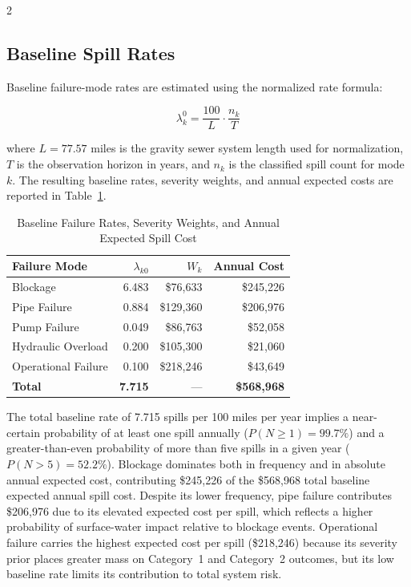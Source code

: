 \documentclass[10pt]{article}
\begin{document}
\begin{multicols}{2}
\subsection{Baseline Spill Rates}
 
Baseline failure-mode rates are estimated using the normalized
rate formula:
 
\[
\lambda_k^0 = \frac{100}{L} \cdot \frac{n_k}{T}
\]
 
where $L = 77.57$ miles is the gravity sewer system length used for
normalization, $T$ is the observation horizon in years, and $n_k$ is
the classified spill count for mode $k$. The resulting baseline rates,
severity weights, and annual expected costs are reported in
Table~\ref{tab:baseline-rates}.
 
\begin{table}[H]
\centering
\caption{Baseline Failure Rates, Severity Weights, and Annual
         Expected Spill Cost}
\label{tab:baseline-rates}
\begin{tabular}{lrrr}
\toprule
\textbf{Failure Mode} & \textbf{$\lambda_{k0}$} & \textbf{$W_k$}
  & \textbf{Annual Cost} \\
\midrule
Blockage           & 6.483 & \$76{,}633  & \$245{,}226 \\
Pipe Failure       & 0.884 & \$129{,}360 & \$206{,}976 \\
Pump Failure       & 0.049 & \$86{,}763  & \$52{,}058  \\
Hydraulic Overload & 0.200 & \$105{,}300 & \$21{,}060  \\
Operational Failure& 0.100 & \$218{,}246 & \$43{,}649  \\
\midrule
\textbf{Total}     & \textbf{7.715} & --- & \textbf{\$568{,}968} \\
\bottomrule
\end{tabular}
\end{table}
 
The total baseline rate of 7.715 spills per 100 miles per year implies
a near-certain probability of at least one spill annually
($P(N \ge 1) = 99.7\%$) and a greater-than-even probability of more
than five spills in a given year ($P(N > 5) = 52.2\%$). Blockage
dominates both in frequency and in absolute annual expected cost,
contributing \$245{,}226 of the \$568{,}968 total baseline expected
annual spill cost. Despite its lower frequency, pipe failure
contributes \$206{,}976 due to its elevated expected cost per spill,
which reflects a higher probability of surface-water impact relative
to blockage events. Operational failure carries the highest expected
cost per spill (\$218{,}246) because its severity prior places
greater mass on Category~1 and Category~2 outcomes, but its low
baseline rate limits its contribution to total system risk.
 

\end{multicols}
\end{document}
